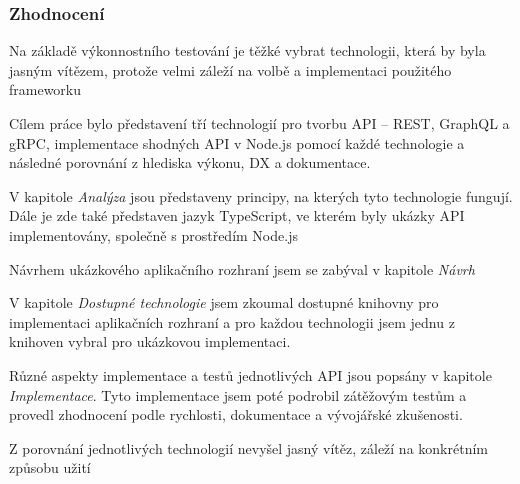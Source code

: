 \documentclass[thesis=M,czech]{FITthesis}[2019/12/23]
\begin{document}
\subsubsection*{Zhodnocení}
Na základě výkonnostního testování je těžké vybrat technologii, která by byla jasným vítězem, protože velmi záleží na volbě a implementaci použitého frameworku

\begin{conclusion}
Cílem práce bylo představení tří technologií pro tvorbu API -- REST, GraphQL a gRPC, implementace shodných API v Node.js pomocí každé technologie a následné porovnání z hlediska výkonu, DX a dokumentace.

V kapitole \textit{Analýza} jsou představeny principy, na kterých tyto technologie fungují. Dále je zde také představen jazyk TypeScript, ve kterém byly ukázky API implementovány, společně s prostředím Node.js

Návrhem ukázkového aplikačního rozhraní jsem se zabýval v kapitole \textit{Návrh}

V kapitole \textit{Dostupné technologie} jsem zkoumal dostupné knihovny pro implementaci aplikačních rozhraní a pro každou technologii jsem jednu z knihoven vybral pro ukázkovou implementaci.

Různé aspekty implementace a testů jednotlivých API jsou popsány v kapitole \textit{Implementace}. Tyto implementace jsem poté podrobil zátěžovým testům a provedl zhodnocení podle rychlosti, dokumentace a vývojářské zkušenosti.

Z porovnání jednotlivých technologií nevyšel jasný vítěz, záleží na konkrétním způsobu užití %


\end{conclusion}




\appendix
\end{document}
